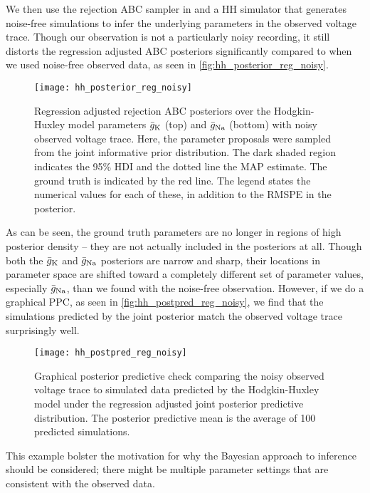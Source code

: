 We then use the rejection ABC sampler in  and a HH simulator that generates noise-free simulations to infer the underlying parameters in the observed voltage trace. Though our observation is not a particularly noisy recording, it still distorts the regression adjusted ABC posteriors significantly compared to when we used noise-free observed data, as seen in \autoref{fig:hh_posterior_reg_noisy}.
\begin{figure}[!htb]
    \centering
    \texttt{[image: hh\_posterior\_reg\_noisy]}
    \caption{Regression adjusted rejection ABC posteriors over the Hodgkin-Huxley model parameters $\bar{g}_{\mathrm{K}}$ (top) and $\bar{g}_{\mathrm{Na}}$ (bottom) with noisy observed voltage trace. Here, the parameter proposals were sampled from the joint informative prior distribution. The dark shaded region indicates the 95\% HDI and the dotted line the MAP estimate. The ground truth is indicated by the red line. The legend states the numerical values for each of these, in addition to the RMSPE in the posterior.}
    \label{fig:hh_posterior_reg_noisy}
\end{figure} 
As can be seen, the ground truth parameters are no longer in regions of high posterior density -- they are not actually included in the posteriors at all. Though both the $\bar{g}_{\mathrm{K}}$ and $\bar{g}_{\mathrm{Na}}$ posteriors are narrow and sharp, their locations in parameter space are shifted toward a completely different set of parameter values, especially $\bar{g}_{\mathrm{Na}}$, than we found with the noise-free observation. However, if we do a graphical PPC, as seen in \autoref{fig:hh_postpred_reg_noisy}, we find that the simulations predicted by the joint posterior match the observed voltage trace surprisingly well. 
\begin{figure}[!htb]
    \centering
    \texttt{[image: hh\_postpred\_reg\_noisy]}
    \caption{Graphical posterior predictive check comparing the noisy observed voltage trace to simulated data predicted by the Hodgkin-Huxley model under the regression adjusted joint posterior predictive distribution. The posterior predictive mean is the average of 100 predicted simulations.}
    \label{fig:hh_postpred_reg_noisy}
\end{figure}
This example bolster the motivation for why the Bayesian approach to inference should be considered; there might be multiple parameter settings that are consistent with the observed data.





